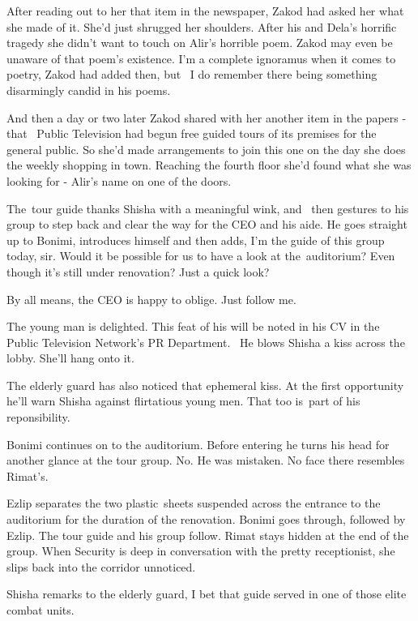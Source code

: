 \documentclass[12pt]{book}
\begin{document}
After reading out to her that item in the newspaper, Zakod had asked her what she made of it. She'd just shrugged her
shoulders. After his and Dela's horrific tragedy she didn't want to touch on Alir's horrible poem. Zakod may even be
unaware of that poem's existence. {\textquotedbl}I'm a complete ignoramus when it comes to poetry,{\textquotedbl} Zakod
had added then, {\textquotedbl}but ~I do remember there being something disarmingly candid in his poems{\textquotedbl}.


And then a day or two later Zakod shared with her another item in the papers - that ~Public Television had begun free
guided tours of its premises for the general public. So she'd made arrangements to join this one on the day she does
the weekly shopping in town. Reaching the fourth floor she'd found what she was looking for - Alir's name on one of the
doors.

The~tour guide thanks Shisha with a meaningful wink, and \ then gestures to his group to step back and clear the way for
the CEO and his aide. He goes straight up to Bonimi, introduces himself and then adds, {\textquotedbl} I'm the guide of
this group today, sir. Would it be possible for us to have a look at the~auditorium? Even though it's still under
renovation? Just a quick look?{\textquotedbl}

{\textquotedbl}By all means,{\textquotedbl} the CEO is happy to oblige. {\textquotedbl}Just follow me.{\textquotedbl}

The young man is delighted. This feat of his will be noted in his CV in the Public Television Network's PR Department.
~He blows Shisha a kiss across the lobby. She'll hang onto it.

The elderly guard has also noticed that ephemeral kiss. \MakeUppercase{A}t the first opportunity he'll warn Shisha
against flirtatious young men. That too is~part of his reponsibility.

Bonimi continues on to the auditorium. Before entering he turns his head for another glance at the tour group. No. He
was mistaken. No face there resembles Rimat's.

Ezlip separates the two plastic~sheets suspended across the entrance to the auditorium for the duration of the
renovation. Bonimi goes through, followed by Ezlip. The tour guide and his group follow. Rimat stays hidden at the end
of the group. When Security is deep in conversation with the pretty receptionist, she slips back into the corridor
unnoticed.

Shisha remarks to the elderly guard, {\textquotedbl}I bet that guide served in one of those elite combat
units.{\textquotedbl} \
\end{document}
